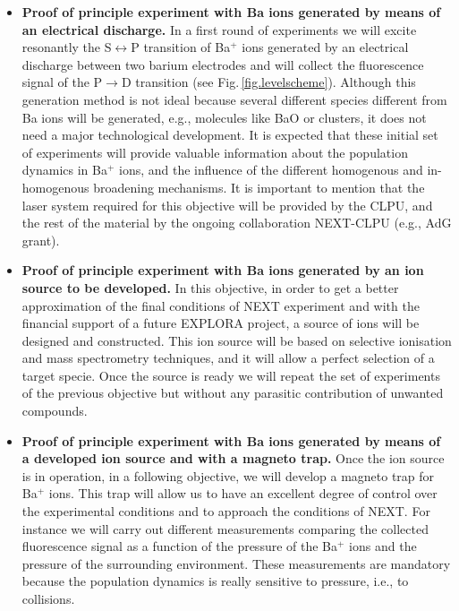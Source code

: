 \documentclass[a4paper,11pt,oneside]{article}
\begin{document}
\begin{itemize}
	\item \textbf{Proof of principle experiment with Ba ions generated by means of an electrical discharge.}
In a first round of experiments we will excite resonantly the S$\leftrightarrow$P transition of Ba$^+$ ions generated by an electrical discharge between two barium electrodes and will collect the fluorescence signal of the P$\rightarrow$D transition (see Fig.\,\ref{fig.levelscheme}). Although this generation method is not ideal because several different species different from Ba ions will be generated, e.g., molecules like BaO or clusters, it does not need a major technological development. It is expected that these initial set of experiments will provide valuable information about the population dynamics in Ba$^+$ ions, and the influence of the different homogenous and in-homogenous broadening mechanisms. It is important to mention that the laser system required for this objective will be provided by the CLPU, and the rest of the material by the ongoing collaboration NEXT-CLPU (e.g., AdG grant).

	\item \textbf{Proof of principle experiment with Ba ions generated by an ion source to be developed.}	
In this objective, in order to get a better approximation of the final conditions of NEXT experiment and with the financial support of a future EXPLORA project, a source of ions will be designed and constructed. This ion source will be based on selective ionisation and mass spectrometry techniques, and it will allow a perfect selection of a target specie. Once the source is ready we will repeat the set of experiments of the previous objective but without any parasitic contribution of unwanted compounds. 
	
	\item \textbf{Proof of principle experiment with Ba ions generated by means of a developed ion source and with a magneto trap.}	
Once the ion source is in operation, in a following objective, we will develop a magneto trap for Ba$^+$  ions. This trap will allow us to have an excellent degree of control over the experimental conditions and to approach the conditions of NEXT. For instance we will carry out different measurements comparing the collected fluorescence signal as a function of the pressure of the Ba$^+$ ions and the pressure of the surrounding environment. These measurements are mandatory because the population dynamics is really sensitive to pressure, i.e., to collisions. 
	

\end{itemize}
\end{document}
